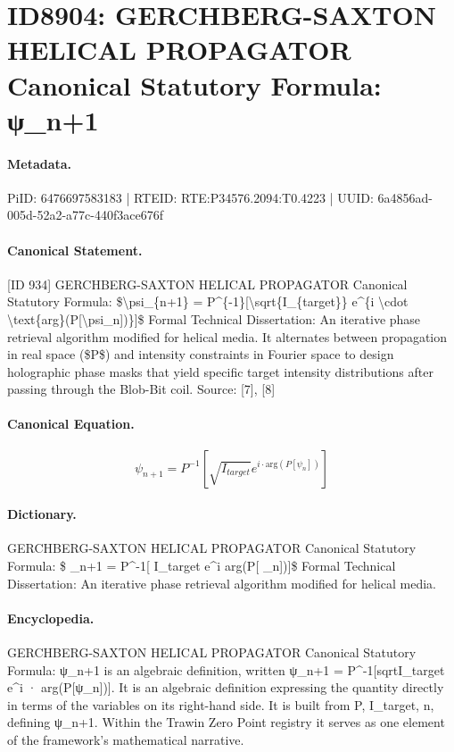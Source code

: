 \section*{ID8904: GERCHBERG-SAXTON HELICAL PROPAGATOR Canonical Statutory Formula: ψ\_n+1}
\paragraph{Metadata.}
PiID: 6476697583183 | RTEID: RTE:P34576.2094:T0.4223 | UUID: 6a4856ad-005d-52a2-a77c-440f3ace676f

\paragraph{Canonical Statement.}
[ID 934] GERCHBERG-SAXTON HELICAL PROPAGATOR Canonical Statutory Formula: \$\textbackslash{}psi\_\{n+1\} = P\textasciicircum{}\{-1\}[\textbackslash{}sqrt\{I\_\{target\}\} e\textasciicircum{}\{i \textbackslash{}cdot \textbackslash{}text\{arg\}(P[\textbackslash{}psi\_n])\}]\$ Formal Technical Dissertation: An iterative phase retrieval algorithm modified for helical media. It alternates between propagation in real space (\$P\$) and intensity constraints in Fourier space to design holographic phase masks that yield specific target intensity distributions after passing through the Blob-Bit coil. Source: [7], [8]

\paragraph{Canonical Equation.}
\[
\psi_{n+1} = P^{-1}[\sqrt{I_{target}} e^{i \cdot \text{arg}(P[\psi_n])}]
\]

\paragraph{Dictionary.}
GERCHBERG-SAXTON HELICAL PROPAGATOR Canonical Statutory Formula: \$ \_n+1 = P\textasciicircum{}-1[ I\_target e\textasciicircum{}i arg(P[ \_n])]\$ Formal Technical Dissertation: An iterative phase retrieval algorithm modified for helical media.

\paragraph{Encyclopedia.}
GERCHBERG-SAXTON HELICAL PROPAGATOR Canonical Statutory Formula: ψ\_n+1 is an algebraic definition, written ψ\_n+1 = P\textasciicircum{}-1[sqrtI\_target e\textasciicircum{}i · arg(P[ψ\_n])]. It is an algebraic definition expressing the quantity directly in terms of the variables on its right-hand side. It is built from P, I\_target, n, defining ψ\_n+1. Within the Trawin Zero Point registry it serves as one element of the framework's mathematical narrative.
